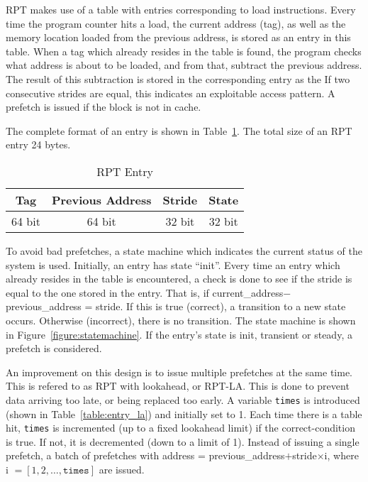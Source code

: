 RPT makes use of a table with entries corresponding to load
instructions. Every time the program counter hits a load, the current
address (tag), as well as the memory location loaded from the previous
address, is stored as an entry in this table. When a tag which already
resides in the table is found, the program checks what address is
about to be loaded, and from that, subtract the previous address. The
result of this subtraction is stored in the corresponding entry as the
If two consecutive strides are equal, this indicates an exploitable
access pattern. A prefetch is issued if the block is not in cache.

The complete format of an entry is shown in
Table~\ref{table:entry}. The total size of an RPT entry 24 bytes.

\begin{table}[h!]
  \centering
  \begin{tabular}{ | c | c | c | c |}
    \hline
    Tag & Previous Address & Stride & State \\ \hline
    64 bit & 64 bit & 32 bit & 32 bit \\ \hline
  \end{tabular}
  \caption{RPT Entry}
  \label{table:entry}
\end{table}

To avoid bad prefetches, a state machine which indicates the current
status of the system is used. Initially, an entry has state
``init''. Every time an entry which already resides in the table is
encountered, a check is done to see if the stride is equal to the one
stored in the entry. That is, if current\_address$ -
$previous\_address = stride. If this is true (correct), a transition
to a new state occurs. Otherwise (incorrect), there is no
transition. The state machine is shown in
Figure~\ref{figure:statemachine}. If the entry's state is init,
transient or steady, a prefetch is considered.

An improvement on this design is to issue multiple prefetches at the
same time. This is refered to as RPT with lookahead, or RPT-LA. This
is done to prevent data arriving too late, or being replaced too
early. A variable \texttt{times} is introduced (shown in
Table~\ref{table:entry_la}) and initially set to 1. Each time there is
a table hit, \texttt{times} is incremented (up to a fixed lookahead
limit) if the correct-condition is true. If not, it is decremented
(down to a limit of 1). Instead of issuing a single prefetch, a batch
of prefetches with address = previous\_address$ + $stride$\times$i,
where i $= [1, 2, \ldots, \texttt{times}]$ are issued.

